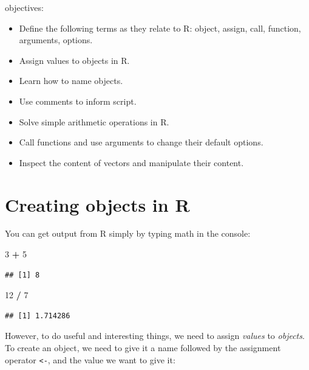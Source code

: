\documentclass[]{book}
\newenvironment{Shaded}{\begin{snugshade}}{\end{snugshade}}
\newcommand{\DecValTok}[1]{\textcolor[rgb]{0.00,0.00,0.81}{#1}}
\newcommand{\StringTok}[1]{\textcolor[rgb]{0.31,0.60,0.02}{#1}}
\newcommand{\OperatorTok}[1]{\textcolor[rgb]{0.81,0.36,0.00}{\textbf{#1}}}
\providecommand{\tightlist}{%
  \setlength{\itemsep}{0pt}\setlength{\parskip}{0pt}}
\begin{document}
objectives:

\begin{itemize}
\tightlist
\item
  Define the following terms as they relate to R: object, assign, call,
  function, arguments, options.\\
\item
  Assign values to objects in R.\\
\item
  Learn how to name objects.\\
\item
  Use comments to inform script.\\
\item
  Solve simple arithmetic operations in R.\\
\item
  Call functions and use arguments to change their default options.\\
\item
  Inspect the content of vectors and manipulate their content.
\end{itemize}

\section{Creating objects in R}\label{creating-objects-in-r}

You can get output from R simply by typing math in the console:

\begin{Shaded}
\begin{Highlighting}[]
\DecValTok{3} \OperatorTok{+}\StringTok{ }\DecValTok{5}
\end{Highlighting}
\end{Shaded}

\begin{verbatim}
## [1] 8
\end{verbatim}

\begin{Shaded}
\begin{Highlighting}[]
\DecValTok{12} \OperatorTok{/}\StringTok{ }\DecValTok{7}
\end{Highlighting}
\end{Shaded}

\begin{verbatim}
## [1] 1.714286
\end{verbatim}

However, to do useful and interesting things, we need to assign
\emph{values} to \emph{objects}. To create an object, we need to give it
a name followed by the assignment operator \texttt{\textless{}-}, and
the value we want to give it:
\end{document}
